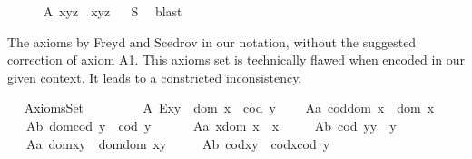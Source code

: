 \begin{isabellebody}
\endisatagproof
{\isafoldproof}%
%
\isadelimproof
%
\endisadelimproof
\isanewline
\ \ \ \isamarkupfalse%
\ \ A{}{\isacharcolon}\ {\isachardoublequoteopen}x{\isasymcdot}{\isacharparenleft}y{\isasymcdot}z{\isacharparenright}\ {\isasymcong}\ {\isacharparenleft}x{\isasymcdot}y{\isacharparenright}{\isasymcdot}z{\isachardoublequoteclose}%
\isadelimproof
\ %
\endisadelimproof
%
\isatagproof
{}\isamarkupfalse%
\ S{}\ \isamarkupfalse%
\ blast%
\endisatagproof
{\isafoldproof}%
%
\isadelimproof
%
\endisadelimproof
\isanewline
\ \ \isamarkupfalse%
%
\isamarkuptrue%
%
\begin{isamarkuptext}%
The axioms by Freyd and Scedrov in our notation, without the suggested correction of
       axiom A1. This axioms set is technically flawed 
       when encoded in our given context. It leads to a constricted inconsistency.%
\end{isamarkuptext}\isamarkuptrue%
\ \isamarkupfalse%
\ AxiomsSet{}\ {\isacharequal}\ \isanewline
\ \ \isanewline
\ \ \ \ A{}{\isacharcolon}\ {\isachardoublequoteopen}E{\isacharparenleft}x{\isasymcdot}y{\isacharparenright}\ \isactrlbold {\isasymleftrightarrow}\ dom\ x\ {\isasymcong}\ cod\ y{\isachardoublequoteclose}\ \isanewline
\ \ \ A{}a{\isacharcolon}\ {\isachardoublequoteopen}cod{\isacharparenleft}dom\ x{\isacharparenright}\ {\isasymcong}\ dom\ x\ {\isachardoublequoteclose}\ \ \ \isanewline
\ \ \ A{}b{\isacharcolon}\ {\isachardoublequoteopen}dom{\isacharparenleft}cod\ y{\isacharparenright}\ {\isasymcong}\ cod\ y{\isachardoublequoteclose}\ \ \ \isanewline
\ \ \ A{}a{\isacharcolon}\ {\isachardoublequoteopen}x{\isasymcdot}{\isacharparenleft}dom\ x{\isacharparenright}\ {\isasymcong}\ x{\isachardoublequoteclose}\ \ \isanewline
\ \ \ A{}b{\isacharcolon}\ {\isachardoublequoteopen}{\isacharparenleft}cod\ y{\isacharparenright}{\isasymcdot}y\ {\isasymcong}\ y{\isachardoublequoteclose}\ \ \isanewline
\ \ \ A{}a{\isacharcolon}\ {\isachardoublequoteopen}dom{\isacharparenleft}x{\isasymcdot}y{\isacharparenright}\ {\isasymcong}\ dom{\isacharparenleft}{\isacharparenleft}dom\ x{\isacharparenright}{\isasymcdot}y{\isacharparenright}{\isachardoublequoteclose}\ \ \isanewline
\ \ \ A{}b{\isacharcolon}\ {\isachardoublequoteopen}cod{\isacharparenleft}x{\isasymcdot}y{\isacharparenright}\ {\isasymcong}\ cod{\isacharparenleft}x{\isasymcdot}{\isacharparenleft}cod\ y{\isacharparenright}{\isacharparenright}{\isachardoublequoteclose}\ \ \isanewline

\end{isabellebody}
